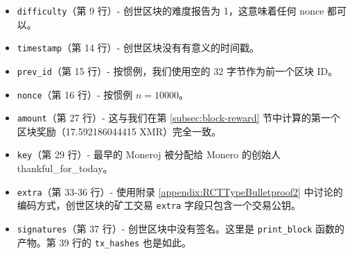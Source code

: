 \begin{appendices}
\begin{itemize}
	\item {\tt difficulty}（第 9 行）- 创世区块的难度报告为 1，这意味着任何 nonce 都可以。
	\item {\tt timestamp}（第 14 行）- 创世区块没有有意义的时间戳。
	\item {\tt prev\_id}（第 15 行）- 按惯例，我们使用空的 32 字节作为前一个区块 ID。
	\item {\tt nonce}（第 16 行）- 按惯例 $n = 10000$。
	\item {\tt amount}（第 27 行）- 这与我们在第 \ref{subsec:block-reward} 节中计算的第一个区块奖励（17.592186044415 XMR）完全一致。
	\item {\tt key}（第 29 行）- 最早的 Moneroj 被分配给 Monero 的创始人 thankful\_for\_today。
	\item {\tt extra}（第 33-36 行）- 使用附录 \ref{appendix:RCTTypeBulletproof2} 中讨论的编码方式，创世区块的矿工交易 {\tt extra} 字段只包含一个交易公钥。
	\item {\tt signatures}（第 37 行）- 创世区块中没有签名。这里是 {\tt print\_block} 函数的产物。第 39 行的 {\tt tx\_hashes} 也是如此。
\end{itemize}


\end{appendices}
